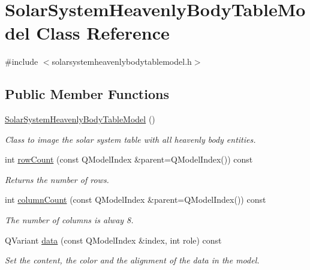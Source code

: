 \hypertarget{classSolarSystemHeavenlyBodyTableModel}{
\section{\-Solar\-System\-Heavenly\-Body\-Table\-Model \-Class \-Reference}
\label{da/d05/classSolarSystemHeavenlyBodyTableModel}
}


{\ttfamily \#include $<$solarsystemheavenlybodytablemodel.\-h$>$}

\subsection*{\-Public \-Member \-Functions}
\begin{DoxyCompactItemize}
\item 
\hyperlink{classSolarSystemHeavenlyBodyTableModel_a9f03fbd9db12edc5caf4990d7f6b9381}{\-Solar\-System\-Heavenly\-Body\-Table\-Model} ()
\begin{DoxyCompactList}\small\item\em \-Class to image the solar system table with all heavenly body entities. \end{DoxyCompactList}\item 
int \hyperlink{classSolarSystemHeavenlyBodyTableModel_abc6d37ab7e0df254fb3c6048ca283ac6}{row\-Count} (const \-Q\-Model\-Index \&parent=\-Q\-Model\-Index()) const 
\begin{DoxyCompactList}\small\item\em \-Returns the number of rows. \end{DoxyCompactList}\item 
int \hyperlink{classSolarSystemHeavenlyBodyTableModel_a65a7aa0fce7e30ff7e9ba06c2fed85fd}{column\-Count} (const \-Q\-Model\-Index \&parent=\-Q\-Model\-Index()) const 
\begin{DoxyCompactList}\small\item\em \-The number of columns is alway 8. \end{DoxyCompactList}\item 
\-Q\-Variant \hyperlink{classSolarSystemHeavenlyBodyTableModel_ae43dcd5109db06fc7515fef09c9a0cfe}{data} (const \-Q\-Model\-Index \&index, int role) const 
\begin{DoxyCompactList}\small\item\em \-Set the content, the color and the alignment of the data in the model. \end{DoxyCompactList}\item 

\end{DoxyCompactItemize}
